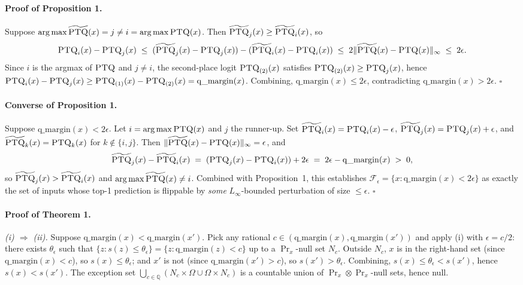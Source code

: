 \documentclass{article}
\newcommand{\ptq}{\textsc{PTQ}\xspace}
\begin{document}
\paragraph{Proof of Proposition 1.}
Suppose $\arg\max\widetilde{\ptq}(x) = j \neq i = \arg\max\ptq(x)$. Then $\widetilde{\ptq}_j(x) \geq \widetilde{\ptq}_i(x)$, so
\[
\ptq_i(x) - \ptq_j(x) \;\leq\; (\widetilde{\ptq}_j(x) - \ptq_j(x)) - (\widetilde{\ptq}_i(x) - \ptq_i(x)) \;\leq\; 2\|\widetilde{\ptq}(x) - \ptq(x)\|_\infty \;\leq\; 2\epsilon.
\]
Since $i$ is the argmax of $\ptq$ and $j \neq i$, the second-place logit $\ptq_{(2)}(x)$ satisfies $\ptq_{(2)}(x) \geq \ptq_j(x)$, hence $\ptq_i(x) - \ptq_j(x) \geq \ptq_{(1)}(x) - \ptq_{(2)}(x) = \mathrm{q\_margin}(x)$. Combining, $\mathrm{q\_margin}(x) \leq 2\epsilon$, contradicting $\mathrm{q\_margin}(x) > 2\epsilon$. \hfill$\square$

\paragraph{Converse of Proposition 1.}
Suppose $\mathrm{q\_margin}(x) < 2\epsilon$. Let $i = \arg\max\ptq(x)$ and $j$ the runner-up. Set $\widetilde{\ptq}_i(x) = \ptq_i(x) - \epsilon$, $\widetilde{\ptq}_j(x) = \ptq_j(x) + \epsilon$, and $\widetilde{\ptq}_k(x) = \ptq_k(x)$ for $k \notin \{i, j\}$. Then $\|\widetilde{\ptq}(x) - \ptq(x)\|_\infty = \epsilon$, and
\[
\widetilde{\ptq}_j(x) - \widetilde{\ptq}_i(x) \;=\; (\ptq_j(x) - \ptq_i(x)) + 2\epsilon \;=\; 2\epsilon - \mathrm{q\_margin}(x) \;>\; 0,
\]
so $\widetilde{\ptq}_j(x) > \widetilde{\ptq}_i(x)$ and $\arg\max\widetilde{\ptq}(x) \neq i$. Combined with Proposition~1, this establishes $\mathcal F_\epsilon = \{x : \mathrm{q\_margin}(x) < 2\epsilon\}$ as exactly the set of inputs whose top-1 prediction is flippable by \emph{some} $L_\infty$-bounded perturbation of size $\leq \epsilon$. \hfill$\square$

\paragraph{Proof of Theorem 1.}
\emph{(i) $\Rightarrow$ (ii).} Suppose $\mathrm{q\_margin}(x) < \mathrm{q\_margin}(x')$. Pick any rational $c \in (\mathrm{q\_margin}(x), \mathrm{q\_margin}(x'))$ and apply (i) with $\epsilon = c/2$: there exists $\theta_\epsilon$ such that $\{z : s(z) \leq \theta_\epsilon\} = \{z : \mathrm{q\_margin}(z) < c\}$ up to a $\Pr_x$-null set $N_c$. Outside $N_c$, $x$ is in the right-hand set (since $\mathrm{q\_margin}(x) < c$), so $s(x) \leq \theta_\epsilon$; and $x'$ is not (since $\mathrm{q\_margin}(x') > c$), so $s(x') > \theta_\epsilon$. Combining, $s(x) \leq \theta_\epsilon < s(x')$, hence $s(x) < s(x')$. The exception set $\bigcup_{c \in \mathbb Q} (N_c \times \Omega \cup \Omega \times N_c)$ is a countable union of $\Pr_x \otimes \Pr_x$-null sets, hence null.
\end{document}
